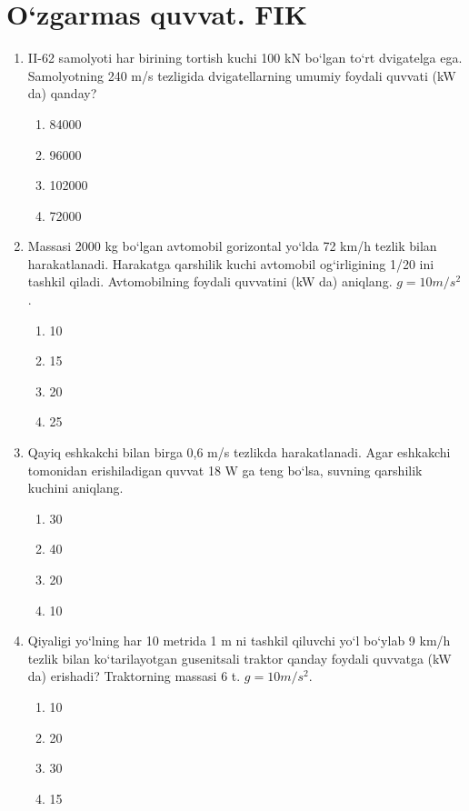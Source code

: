 \section{O‘zgarmas quvvat. FIK}

\begin{enumerate}

\item II-62 samolyoti har birining tortish kuchi 100 kN bo‘lgan to‘rt dvigatelga ega. Samolyotning 240 m/s tezligida dvigatellarning umumiy foydali quvvati (kW da) qanday?
\begin{enumerate}[label=\Alph*)]
\item 84000
\item 96000
\item 102000
\item 72000
\end{enumerate}

\item Massasi 2000 kg bo‘lgan avtomobil gorizontal yo‘lda 72 km/h tezlik bilan harakatlanadi. Harakatga qarshilik kuchi avtomobil og‘irligining 1/20 ini tashkil qiladi. Avtomobilning foydali quvvatini (kW da) aniqlang. $g=10 m/s^2$.
\begin{enumerate}[label=\Alph*)]
\item 10
\item 15
\item 20
\item 25
\end{enumerate}

\item Qayiq eshkakchi bilan birga 0,6 m/s tezlikda harakatlanadi. Agar eshkakchi tomonidan erishiladigan quvvat 18 W ga teng bo‘lsa, suvning qarshilik kuchini aniqlang.
\begin{enumerate}[label=\Alph*)]
\item 30
\item 40
\item 20
\item 10
\end{enumerate}

\item Qiyaligi yo‘lning har 10 metrida 1 m ni tashkil qiluvchi yo‘l bo‘ylab 9 km/h tezlik bilan ko‘tarilayotgan gusenitsali traktor qanday foydali quvvatga (kW da) erishadi? Traktorning massasi 6 t. $g=10 m/s^2$.
\begin{enumerate}[label=\Alph*)]
\item 10
\item 20
\item 30
\item 15
\end{enumerate}


\end{enumerate}
